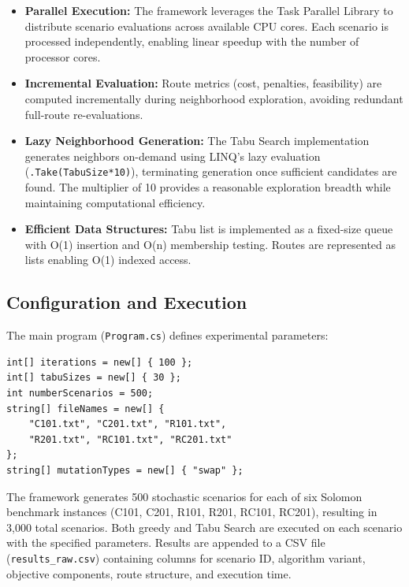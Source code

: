 \begin{itemize}
    \item \textbf{Parallel Execution:} The framework leverages the Task Parallel Library to distribute scenario evaluations across available CPU cores. Each scenario is processed independently, enabling linear speedup with the number of processor cores.
    
    \item \textbf{Incremental Evaluation:} Route metrics (cost, penalties, feasibility) are computed incrementally during neighborhood exploration, avoiding redundant full-route re-evaluations.
    
    \item \textbf{Lazy Neighborhood Generation:} The Tabu Search implementation generates neighbors on-demand using LINQ's lazy evaluation (\texttt{.Take(TabuSize*10)}), terminating generation once sufficient candidates are found. The multiplier of 10 provides a reasonable exploration breadth while maintaining computational efficiency.
    
    \item \textbf{Efficient Data Structures:} Tabu list is implemented as a fixed-size queue with O(1) insertion and O(n) membership testing. Routes are represented as lists enabling O(1) indexed access.
\end{itemize}

\subsection{Configuration and Execution}

The main program (\texttt{Program.cs}) defines experimental parameters:

\begin{verbatim}
int[] iterations = new[] { 100 };
int[] tabuSizes = new[] { 30 };
int numberScenarios = 500;
string[] fileNames = new[] { 
    "C101.txt", "C201.txt", "R101.txt", 
    "R201.txt", "RC101.txt", "RC201.txt" 
};
string[] mutationTypes = new[] { "swap" };
\end{verbatim}

The framework generates 500 stochastic scenarios for each of six Solomon benchmark instances (C101, C201, R101, R201, RC101, RC201), resulting in 3,000 total scenarios. Both greedy and Tabu Search are executed on each scenario with the specified parameters. Results are appended to a CSV file (\texttt{results\_raw.csv}) containing columns for scenario ID, algorithm variant, objective components, route structure, and execution time.

